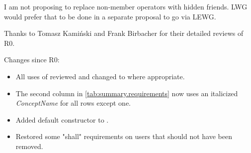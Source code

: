 \vspace{1.5cm}

I am not proposing to replace non-member operators with hidden friends.
LWG would prefer that to be done in a separate proposal to go via LEWG.

Thanks to Tomasz Kamiński and Frank Birbacher for their detailed reviews of R0.

Changes since R0:
\begin{itemize}
\item All uses of  reviewed and changed to
   where appropriate.
\item The second column in \ref{tab:summary.requirements} now uses
  an italicized \textit{ConceptName} for all rows except one.
\item Added  default constructor to .
\item Restored some "shall" requirements on users that should not have been removed.
\end{itemize}


\newpage


{}
\hypertarget{toctarget}{\tableofcontents*}

\setcounter{tocdepth}{5}

%
